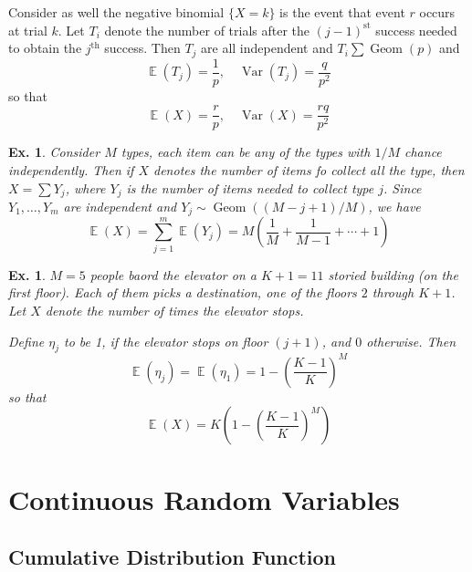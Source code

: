 \documentclass[12pt, a4paper]{book}
\DeclareMathOperator{\E}{\mathbb{E}}
\DeclareMathOperator{\Geom}{Geom}
\DeclareMathOperator{\Var}{Var}
\newtheorem{example}[theorem]{Ex.}
\theoremstyle{nonumberplain}
\begin{document}
Consider as well the negative binomial $\{X=k\}$ is the event that event $r$ occurs at trial $k$.
Let $T_i$ denote the number of trials after the $(j-1)^\text{st}$ success needed to obtain the $j^\text{th}$ success.
Then $T_j$ are all independent and $T_i\sum\Geom(p)$ and
\[\E(T_j)=\frac{1}{p},\quad\Var(T_j)=\frac{q}{p^2}\]
so that
\[\E(X)=\frac{r}{p},\quad\Var(X)=\frac{rq}{p^2}\]
\begin{example}
    Consider $M$ types, each item can be any of the types with $1/M$ chance independently.
    Then if $X$ denotes the number of items fo collect all the type, then $X=\sum Y_j$, where $Y_j$ is the number of items needed to collect type $j$.
    Since $Y_1,\ldots,Y_m$ are independent and $Y_j\sim\Geom((M-j+1)/M)$, we have
    \[\E(X)=\sum\limits_{j=1}^m\E(Y_j)=M\left(\frac{1}{M}+\frac{1}{M-1}+\cdots+1\right)\]
\end{example}
\begin{example}
    $M=5$ people baord the elevator on a $K+1=11$ storied building (on the first floor).
    Each of them picks a destination, one of the floors $2$ through $K+1$.
    Let $X$ denote the number of times the elevator stops.

    Define $\eta_j$ to be 1, if the elevator stops on floor $(j+1)$, and $0$ otherwise.
    Then
    \[\E(\eta_j)=\E(\eta_1)=1-\left(\frac{K-1}{K}\right)^M\]
    so that
    \[\E(X)=K\left(1-\left(\frac{K-1}{K}\right)^M\right)\]
\end{example}
\chapter{Continuous Random Variables}
\section{Cumulative Distribution Function}
\end{document}
